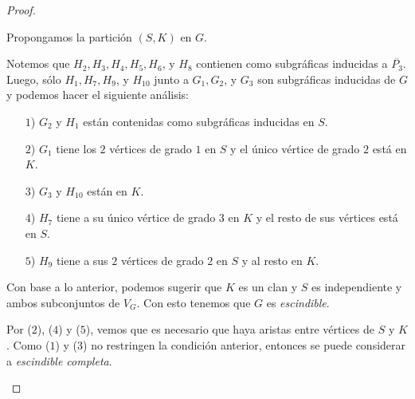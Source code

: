 \documentclass{article}
\begin{document}
\begin{enumerate}
\begin{proof}
\begin{itemize}
\begin{figure}[ht!]
          \end{figure}
          
          
          Propongamos la partición $(S, K)$ en $G$.

          Notemos que $H_2, H_3, H_4, H_5, H_6$, y $H_8$ contienen como subgr\'aficas inducidas a
          $\overline{P_3}$. \\
          Luego, s\'olo $H_1, H_7, H_9$, y $H_{10}$ junto a $G_1, G_2$, y $G_3$
          son subgr\'aficas inducidas de $G$ y podemos hacer el siguiente an\'alisis:

          \begin{itemize}
            \item[$1$)] $G_2$ y $H_1$ est\'an contenidas como subgráficas inducidas en $S$.

            \item[$2$)] $G_1$ tiene los $2$ v\'ertices de grado $1$ en $S$ y el \'unico
              v\'ertice de grado $2$ est\'a en $K$.

            \item[$3$)] $G_3$ y $H_{10}$ est\'an en $K$.

            \item[$4$)] $H_7$ tiene a su \'unico v\'ertice de grado $3$ en $K$ y el resto de
              sus v\'ertices est\'a en $S$.

            \item[$5$)] $H_9$ tiene a sus $2$ v\'ertices de grado $2$ en $S$ y al resto en $K$.
          \end{itemize}

          Con base a lo anterior, podemos sugerir que $K$ es un clan y $S$ es independiente y
          ambos subconjuntos de $V_G$. Con esto tenemos que $G$ es \textit{escindible}.
          
          Por ($2$), ($4$) y ($5$), vemos que es necesario que haya aristas entre v\'ertices de $S$
          y $K$. Como ($1$) y ($3$) no restringen la condición anterior, entonces se puede
          considerar a \textit{escindible completa}.
      \end{itemize}


\end{proof}
\end{enumerate}
\end{document}
